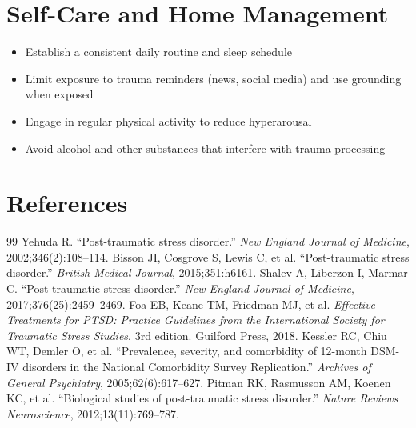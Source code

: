 \section*{Self-Care and Home Management}
\begin{itemize}
  \item Establish a consistent daily routine and sleep schedule
  \item Limit exposure to trauma reminders (news, social media) and use grounding when exposed
  \item Engage in regular physical activity to reduce hyperarousal
  \item Avoid alcohol and other substances that interfere with trauma processing
\end{itemize}

\section*{References}
\begin{thebibliography}{99}
 Yehuda R. ``Post-traumatic stress disorder.'' \textit{New England Journal of Medicine}, 2002;346(2):108--114.
 Bisson JI, Cosgrove S, Lewis C, et al. ``Post-traumatic stress disorder.'' \textit{British Medical Journal}, 2015;351:h6161.
 Shalev A, Liberzon I, Marmar C. ``Post-traumatic stress disorder.'' \textit{New England Journal of Medicine}, 2017;376(25):2459--2469.
 Foa EB, Keane TM, Friedman MJ, et al. \textit{Effective Treatments for PTSD: Practice Guidelines from the International Society for Traumatic Stress Studies}, 3rd edition. Guilford Press, 2018.
 Kessler RC, Chiu WT, Demler O, et al. ``Prevalence, severity, and comorbidity of 12-month DSM-IV disorders in the National Comorbidity Survey Replication.'' \textit{Archives of General Psychiatry}, 2005;62(6):617--627.
 Pitman RK, Rasmusson AM, Koenen KC, et al. ``Biological studies of post-traumatic stress disorder.'' \textit{Nature Reviews Neuroscience}, 2012;13(11):769--787.

\end{thebibliography}
